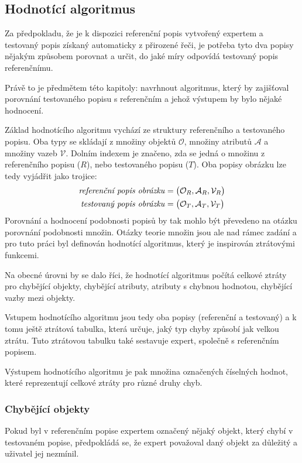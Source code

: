 \subsection{Hodnotící algoritmus}
Za předpokladu, že je k dispozici referenční popis vytvořený expertem a testovaný popis získaný automaticky z přirozené řeči,
je potřeba tyto dva popisy nějakým způsobem porovnat a určit, do jaké míry odpovídá testovaný popis referenčnímu.

Právě to je předmětem této kapitoly: navrhnout algoritmus, který by zajišťoval porovnání testovaného popisu s referenčním a jehož výstupem by bylo nějaké hodnocení.

Základ hodnotícího algoritmu vychází ze struktury referenčního a testovaného popisu.
Oba typy se skládají z množiny objektů $\mathcal O$, množiny atributů $\mathcal A$ a množiny vazeb $\mathcal V$.
Dolním indexem je značeno, zda se jedná o množinu z referenčního popisu ($R$), nebo testovaného popisu ($T$).
Oba popisy obrázku lze tedy vyjádřit jako trojice:
\begin{align*}
	\text{\emph{referenční popis obrázku}} & = \bigl( \mathcal{O}_{R}, \mathcal{A}_{R}, \mathcal{V}_{R} \bigr) \\
	\text{\emph{testovaný popis obrázku}}  & = \bigl( \mathcal{O}_{T}, \mathcal{A}_{T}, \mathcal{V}_{T} \bigr)
\end{align*}
Porovnání a hodnocení podobnosti popisů by tak mohlo být převedeno na otázku porovnání podobnosti množin.
Otázky teorie množin jsou ale nad rámec zadání a pro tuto práci byl definován hodnotící algoritmus,
který je inspirován ztrátovými funkcemi.

Na obecné úrovni by se dalo říci, že hodnotící algoritmus počítá celkové ztráty pro chybějící objekty,
chybějící atributy, atributy s chybnou hodnotou, chybějící vazby mezi objekty.

Vstupem hodnotícího algoritmu jsou tedy oba popisy (referenční a testovaný) a k tomu ještě ztrátová tabulka, která určuje, jaký typ chyby způsobí jak velkou ztrátu.
Tuto ztrátovou tabulku také sestavuje expert, společně s referenčním popisem.

Výstupem hodnotícího algoritmu je pak množina označených číselných hodnot, které reprezentují celkové ztráty pro různé druhy chyb.

\newpage
\subsubsection{Chybějící objekty}
Pokud byl v referenčním popise expertem označený nějaký objekt,
který chybí v testovaném popise, předpokládá se, že expert považoval daný objekt za důležitý a uživatel jej nezmínil.

